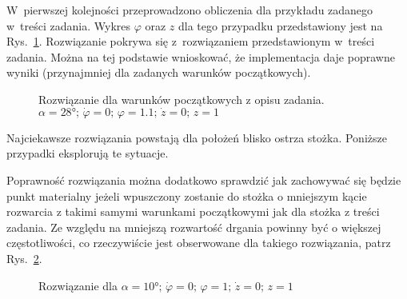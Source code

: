 \documentclass[a4paper; 12pt]{article}
\begin{document}
W~pierwszej kolejności przeprowadzono obliczenia dla przykładu zadanego
w~treści zadania.
Wykres $\varphi$ oraz $z$ dla tego przypadku przedstawiony jest na
Rys.~\ref{fig:data1}.
Rozwiązanie pokrywa się z~rozwiązaniem przedstawionym w~treści zadania.
Można na tej podstawie wnioskować, że implementacja daje poprawne wyniki
(przynajmniej dla zadanych warunków początkowych).
\begin{figure}[h]
    \centering
    \caption{Rozwiązanie dla warunków początkowych z opisu zadania.
        $\alpha=\ang{28};\,\dot{\varphi}=0;\,\varphi=\num{1.1};\,\dot{z}=0;\,z=1$}
    \label{fig:data1}
\end{figure}

Najciekawsze rozwiązania powstają dla położeń blisko ostrza stożka.
Poniższe przypadki eksplorują te sytuacje.

Poprawność rozwiązania można dodatkowo sprawdzić jak zachowywać się będzie
punkt materialny jeżeli wpuszczony zostanie do stożka o mniejszym kącie
rozwarcia z takimi samymi warunkami początkowymi jak dla stożka z treści
zadania.
Ze względu na mniejszą rozwartość drgania powinny być o większej
częstotliwości, co rzeczywiście jest obserwowane dla takiego rozwiązania, patrz
Rys.~\ref{fig:data2}.
\begin{figure}[h]
    \centering
    \caption{Rozwiązanie dla $\alpha=\ang{10};\,\dot{\varphi}=0;\,\varphi=\num{1};\,\dot{z}=0;\,z=1$}
    \label{fig:data2}
\end{figure}
\end{document}
